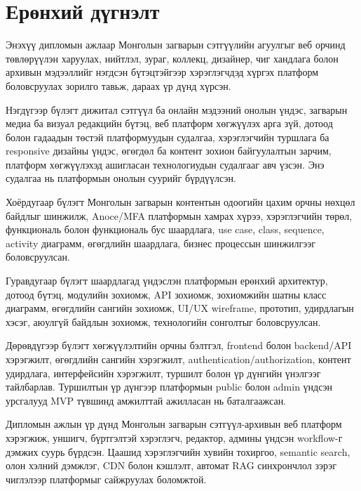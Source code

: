
\chapter*{Ерөнхий дүгнэлт}
\myformat

Энэхүү дипломын ажлаар Монголын загварын сэтгүүлийн агуулгыг веб орчинд төвлөрүүлэн харуулах, нийтлэл, зураг, коллекц, дизайнер, чиг хандлага болон архивын мэдээллийг нэгдсэн бүтэцтэйгээр хэрэглэгчдэд хүргэх платформ боловсруулах зорилго тавьж, дараах үр дүнд хүрсэн.

Нэгдүгээр бүлэгт дижитал сэтгүүл ба онлайн мэдээний онолын үндэс, загварын медиа ба визуал редакцийн бүтэц, веб платформ хөгжүүлэх арга зүй, дотоод болон гадаадын төстэй платформуудын судалгаа, хэрэглэгчийн туршлага ба responsive дизайны үндэс, өгөгдөл ба контент зохион байгуулалтын зарчим, платформ хөгжүүлэхэд ашигласан технологиудын судалгааг авч үзсэн. Энэ судалгаа нь платформын онолын суурийг бүрдүүлсэн.

Хоёрдугаар бүлэгт Монголын загварын контентын одоогийн цахим орчны нөхцөл байдлыг шинжилж, Anoce/MFA платформын хамрах хүрээ, хэрэглэгчийн төрөл, функциональ болон функциональ бус шаардлага, use case, class, sequence, activity диаграмм, өгөгдлийн шаардлага, бизнес процессын шинжилгээг боловсруулсан.

Гуравдугаар бүлэгт шаардлагад үндэслэн платформын ерөнхий архитектур, дотоод бүтэц, модулийн зохиомж, API зохиомж, зохиомжийн шатны класс диаграмм, өгөгдлийн сангийн зохиомж, UI/UX wireframe, прототип, удирдлагын хэсэг, аюулгүй байдлын зохиомж, технологийн сонголтыг боловсруулсан.

Дөрөвдүгээр бүлэгт хөгжүүлэлтийн орчны бэлтгэл, frontend болон backend/API хэрэгжилт, өгөгдлийн сангийн хэрэгжилт, authentication/authorization, контент удирдлага, интерфейсийн хэрэгжилт, туршилт болон үр дүнгийн үнэлгээг тайлбарлав. Туршилтын үр дүнгээр платформын public болон admin үндсэн урсгалууд MVP түвшинд амжилттай ажилласан нь баталгаажсан.

Дипломын ажлын үр дүнд Монголын загварын сэтгүүл-архивын веб платформ хэрэгжиж, уншигч, бүртгэлтэй хэрэглэгч, редактор, админы үндсэн workflow-г дэмжих суурь бүрдсэн. Цаашид хэрэглэгчийн хувийн тохиргоо, semantic search, олон хэлний дэмжлэг, CDN болон кэшлэлт, автомат RAG синхрончлол зэрэг чиглэлээр платформыг сайжруулах боломжтой.
